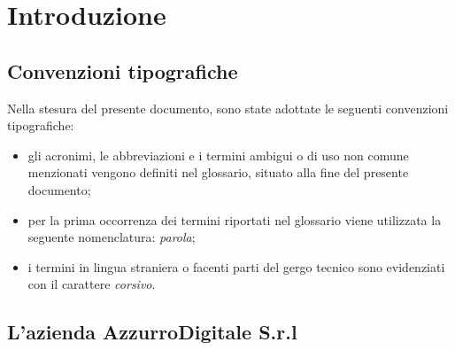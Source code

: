 
\chapter{Introduzione}
\label{cap:introduzione}

\section{Convenzioni tipografiche}
Nella stesura del presente documento, sono state adottate le seguenti convenzioni tipografiche:
\begin{itemize}
	\item gli acronimi, le abbreviazioni e i termini ambigui o di uso non comune menzionati vengono definiti nel glossario, situato alla fine del presente documento;
	\item per la prima occorrenza dei termini riportati nel glossario viene utilizzata la seguente nomenclatura: \emph{parola}\glsfirstoccur;
	\item i termini in lingua straniera o facenti parti del gergo tecnico sono evidenziati con il carattere \emph{corsivo}.
\end{itemize}




\section{L'azienda AzzurroDigitale S.r.l}

